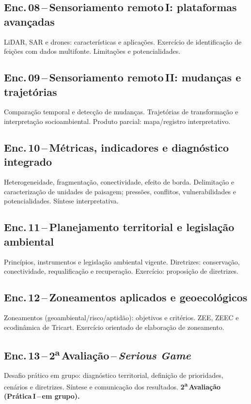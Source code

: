 \documentclass[11pt,a4paper]{article}
\begin{document}
\subsection*{Enc.\,08\,--\,Sensoriamento remoto\,I: plataformas avançadas}
LiDAR, SAR e drones: características e aplicações. Exercício de identificação de feições com dados multifonte. Limitações e potencialidades.

\subsection*{Enc.\,09\,--\,Sensoriamento remoto\,II: mudanças e trajetórias}
Comparação temporal e detecção de mudanças. Trajetórias de transformação e interpretação socioambiental. Produto parcial: mapa/registro interpretativo.

\subsection*{Enc.\,10\,--\,Métricas, indicadores e diagnóstico integrado}
Heterogeneidade, fragmentação, conectividade, efeito de borda. Delimitação e caracterização de unidades de paisagem; pressões, conflitos, vulnerabilidades e potencialidades. Síntese interpretativa.

\subsection*{Enc.\,11\,--\,Planejamento territorial e legislação ambiental}
Princípios, instrumentos e legislação ambiental vigente. Diretrizes: conservação, conectividade, requalificação e recuperação. Exercício: proposição de diretrizes.

\subsection*{Enc.\,12\,--\,Zoneamentos aplicados e geoecológicos}
Zoneamentos (geoambiental/risco/aptidão): objetivos e critérios. ZEE, ZEEC e ecodinâmica de Tricart. Exercício orientado de elaboração de zoneamento.

\subsection*{Enc.\,13\,--\,2\textsuperscript{a}\,Avaliação\,--\,\textit{Serious Game}}
Desafio prático em grupo: diagnóstico territorial, definição de prioridades, cenários e diretrizes. Síntese e comunicação dos resultados. \textbf{2\textsuperscript{a}\,Avaliação (Prática\,I\,--\,em grupo).}
\end{document}
